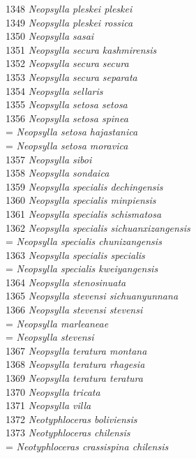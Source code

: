\documentclass[
]{article}
\begin{document}
1348 \emph{Neopsylla pleskei pleskei}\\
1349 \emph{Neopsylla pleskei rossica}\\
1350 \emph{Neopsylla sasai}\\
1351 \emph{Neopsylla secura kashmirensis}\\
1352 \emph{Neopsylla secura secura}\\
1353 \emph{Neopsylla secura separata}\\
1354 \emph{Neopsylla sellaris}\\
1355 \emph{Neopsylla setosa setosa}\\
1356 \emph{Neopsylla setosa spinea}\\
= \emph{Neopsylla setosa hajastanica}\\
= \emph{Neopsylla setosa moravica}\\
1357 \emph{Neopsylla siboi}\\
1358 \emph{Neopsylla sondaica}\\
1359 \emph{Neopsylla specialis dechingensis}\\
1360 \emph{Neopsylla specialis minpiensis}\\
1361 \emph{Neopsylla specialis schismatosa}\\
1362 \emph{Neopsylla specialis sichuanxizangensis}\\
= \emph{Neopsylla specialis chunizangensis}\\
1363 \emph{Neopsylla specialis specialis}\\
= \emph{Neopsylla specialis kweiyangensis}\\
1364 \emph{Neopsylla stenosinuata}\\
1365 \emph{Neopsylla stevensi sichuanyunnana}\\
1366 \emph{Neopsylla stevensi stevensi}\\
= \emph{Neopsylla marleaneae}\\
= \emph{Neopsylla stevensi}\\
1367 \emph{Neopsylla teratura montana}\\
1368 \emph{Neopsylla teratura rhagesia}\\
1369 \emph{Neopsylla teratura teratura}\\
1370 \emph{Neopsylla tricata}\\
1371 \emph{Neopsylla villa}\\
1372 \emph{Neotyphloceras boliviensis}\\
1373 \emph{Neotyphloceras chilensis}\\
= \emph{Neotyphloceras crassispina chilensis}\\
\end{document}
